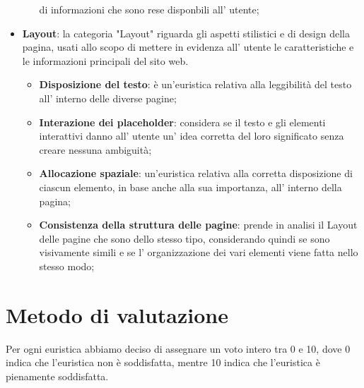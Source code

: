 \begin{itemize}
\begin{itemize}
            di informazioni che sono rese disponbili all' utente;
        \end{itemize}
        \item \textbf{Layout}: la categoria "Layout" riguarda gli aspetti
        stilistici e di design della pagina, usati allo scopo di mettere in
        evidenza all' utente le caratteristiche e le informazioni principali
        del sito web.
        \begin{itemize}
            \item \textbf{Disposizione del testo}: è un'euristica relativa
            alla leggibilità del testo all' interno delle diverse pagine;
            \item \textbf{Interazione dei placeholder}:  considera se il
            testo e gli elementi interattivi danno all' utente un' idea
            corretta del loro significato senza creare nessuna ambiguità;
            \item \textbf{Allocazione spaziale}: un'euristica relativa alla
            corretta disposizione di ciascun elemento, in base anche alla
            sua importanza, all' interno della pagina;
            \item \textbf{Consistenza della struttura delle pagine}: prende
            in analisi il Layout delle pagine che sono dello stesso tipo,
            considerando quindi se sono visivamente simili e se l'
            organizzazione dei vari elementi viene fatta nello stesso modo;
        \end{itemize}
    \end{itemize}
    \section{Metodo di valutazione}
    Per ogni euristica abbiamo deciso di assegnare un voto intero tra 0 e 10,
    dove 0 indica che l'euristica non è soddisfatta, mentre 10 indica che
    l'euristica è pienamente soddisfatta.